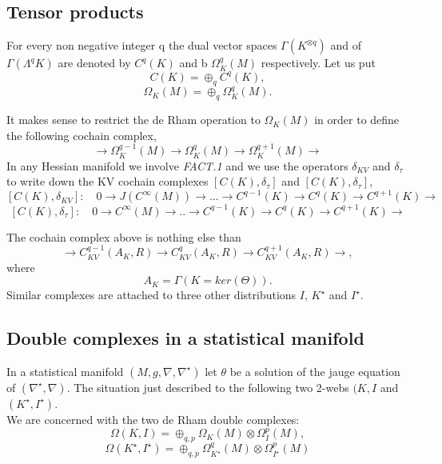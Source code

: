 \subsection{Tensor products}
For every non negative integer q the dual vector spaces 
$\Gamma(K^{\otimes q})$ and of $\Gamma(\Lambda^qK)$ are denoted by  $C^q(K)$ and b $\Omega^q_K(M)$ respectively. Let us put
$$C(K) = \oplus_qC^q (K),$$
$$\Omega_K(M) = \oplus_q \Omega^q_K(M).$$

It makes sense to restrict the de Rham operation to $\Omega_K(M)$ in order to define the following cochain complex,
$$\rightarrow \Omega^{q-1}_K(M) \rightarrow \Omega^q_K(M) \rightarrow \Omega^{q+1}_K(M) \rightarrow  $$
In any Hessian manifold we involve \textit{FACT.1} and we use the operators $\delta_{KV}$ and $\delta_\tau$ to write down the KV cochain complexes $[C(K),\delta_\tau]$ and $[C(K),\delta_\tau]$,
$$[C(K),\delta_{KV}]:\quad 0\rightarrow J(C^\infty(M)) \rightarrow ... \rightarrow C^{q-1}(K)\rightarrow C^q(K)\rightarrow C^{q+1}(K)\rightarrow $$
$$[C(K),\delta_\tau]:\quad 0\rightarrow C^\infty(M)\rightarrow..\rightarrow C^{q-1}(K)\rightarrow C^q(K)\rightarrow C^{q+1}(K)\rightarrow $$



The cochain complex above is nothing else than
$$\rightarrow C^{q-1}_{KV}(A_K,R)\rightarrow  C^q_{KV}(A_K,R)\rightarrow C^{q+1}_{KV}(A_K,R)\rightarrow, $$
where
$$A_K = \Gamma(K = ker(\Theta)).$$
Similar complexes are attached to three other distributions $I$, $K^\star$ and $I^\star$.
\subsection{Double complexes in a statistical manifold}
In a statistical manifold $(M,g,\nabla,\nabla^\star)$ let $\theta$ be a solution of the jauge equation of $(\nabla^\star,\nabla)$. The situation just described to the following two 2-webs
$(K,I$ and $(K^\star,I^\star)$.\\
We are concerned with the two de Rham double complexes:  
$$\Omega(K,I) = \oplus_{q,p}\Omega_K(M)\otimes \Omega^p_I(M),$$
$$\Omega(K^\star,I^\star) = \oplus_{q,p}\Omega^q_{K^\star}(M)\otimes\Omega^p_{I^\star}(M)$$
